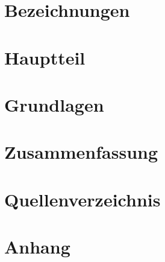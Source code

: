 \documentclass[a4paper,12pt]{article}
\begin{document}



\tableofcontents
\section{Bezeichnungen}

\section{Hauptteil}

\section{Grundlagen}

\section{Zusammenfassung}

\section{Quellenverzeichnis}

\section{Anhang}

\end{document}
